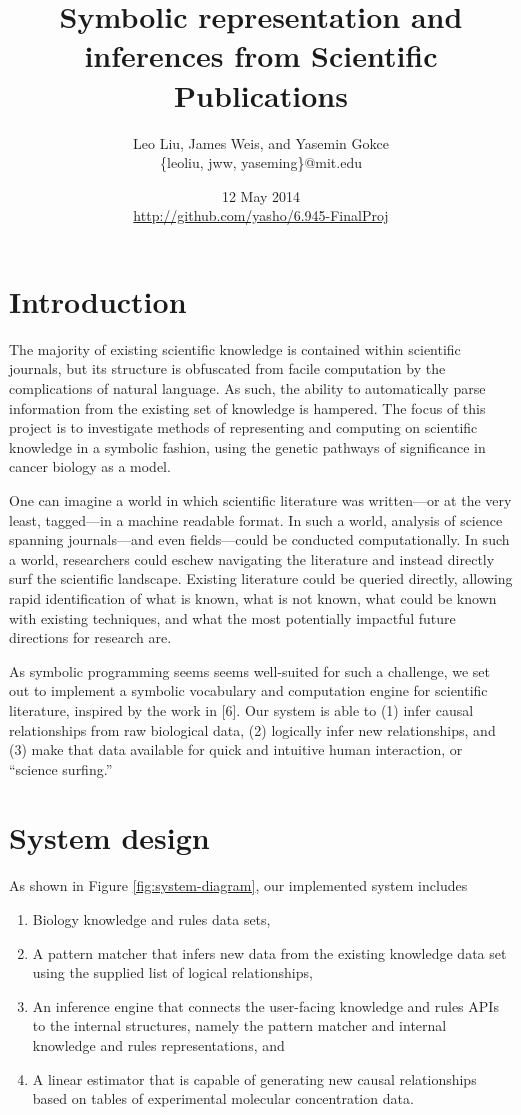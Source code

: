 \documentclass[11pt]{article}
\author{Leo Liu, James Weis, and Yasemin Gokce \\ \{leoliu, jww, yaseming\}@mit.edu}
\date{12 May 2014 \\[\baselineskip] \url{http://github.com/yasho/6.945-FinalProj}}
\title{Symbolic representation and inferences from  Scientific Publications}
\begin{document}
\maketitle
\tableofcontents


\section{Introduction}
\label{sec-1}
The majority of existing scientific knowledge is contained within scientific journals, but its structure is obfuscated from facile computation by the complications of natural language. As such, the ability to automatically parse information from the existing set of knowledge is  hampered. The focus of this project is to investigate methods of representing and computing on scientific knowledge in a symbolic fashion, using the genetic pathways of significance in cancer biology as a model.

One can imagine a world in which scientific literature was written---or at the very least, tagged---in a machine readable format. In such a world, analysis of science spanning journals---and even fields---could be conducted computationally. In such a world, researchers could eschew navigating the literature and instead directly surf the scientific landscape. Existing literature could be queried directly, allowing rapid identification of what is known, what is not known, what could be known with existing techniques, and what the most potentially impactful future directions for research are.

As symbolic programming seems seems well-suited for such a challenge, we set out to implement a symbolic vocabulary and computation engine for scientific literature, inspired by the work in [6]. Our system is able to (1) infer causal relationships from raw biological data, (2) logically infer new relationships, and (3) make that data available for quick and intuitive human interaction, or “science surfing.”
\section{System design}
\label{sec-2}

As shown in Figure \ref{fig:system-diagram}, our implemented system includes
\begin{enumerate}
\item Biology knowledge and rules data sets,
\item A pattern matcher that infers new data from the existing knowledge data set using the supplied list of logical relationships,
\item An inference engine that connects the user-facing knowledge and rules APIs to the internal structures, namely the pattern matcher and internal knowledge and rules representations, and
\item A linear estimator that is capable of generating new causal relationships based on tables of experimental molecular concentration data.
\end{enumerate}
\end{document}
